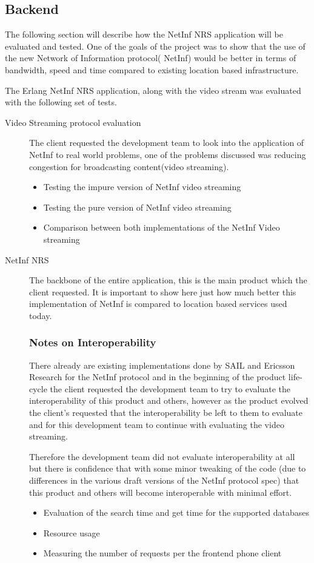 \subsection{Backend}

The following section will describe how the NetInf NRS application will be evaluated and tested. One of the goals of the project was to show that the use of the new Network of Information protocol( NetInf) would be better in terms of bandwidth, speed and time compared to existing location based infrastructure. 

The Erlang NetInf NRS application, along with the video stream was evaluated with the following set of tests. 

\begin{description}
\item [Video Streaming protocol evaluation]
The client requested the development team to look into the application of NetInf to real world problems, one of the problems discussed was reducing congestion for broadcasting content(video streaming). 
\begin{itemize}
\item Testing the impure version of NetInf video streaming 
\item Testing the pure version of NetInf video streaming
\item Comparison between both implementations of the NetInf Video streaming
\end{itemize}
\item[NetInf NRS]
The backbone of the entire application, this is the main product which the client requested. It is important to show here just how much better this implementation of NetInf is compared to location based services used today. 

\subsubsection{Notes on Interoperability}

There already are existing implementations done by SAIL and Ericsson Research for the NetInf protocol and in the beginning of the product life-cycle the client requested the development team to try to evaluate the interoperability of this product and others, however as the product evolved the client's requested that the interoperability be left to them to evaluate and for this development team to continue with evaluating the video streaming.

Therefore the development team did not evaluate interoperability at all but there is confidence that with some minor tweaking of the code (due to differences in the various draft versions of the NetInf protocol spec) that this product and others will become interoperable with minimal effort.


\begin{itemize}
\item Evaluation of the search time and get time for the supported databases
\item Resource usage
\item Measuring the number of requests per the frontend phone client
\end{itemize}
\end{description}